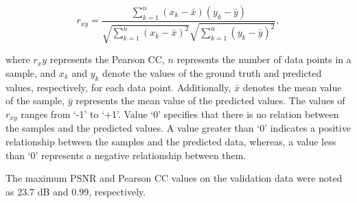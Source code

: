 \begin{equation}
	r_{x 
		y}=\frac{\sum_{k=1}^n\left(x_k-\bar{x}\right)\left(y_k-\bar{y}\right)}{\sqrt{\sum_{k=1}^n\left(x_k-\bar{x}\right)^2}
		\sqrt{\sum_{k=1}^n\left(y_k-\bar{y}\right)^2}},
	\label{eqn:pearsoncc}
\end{equation}

where $r_xy$ represents the Pearson CC, \(n\) represents the number of data points in a sample, and $x_k$ and $y_k$ denote the values of the ground truth and predicted values, respectively, for each data point. 
Additionally, $\bar{x}$ denotes the mean value of the sample, $\bar{y}$ represents the mean value of the predicted values. 
The values of $r_{xy}$ ranges from ‘-1’ to ‘+1’. 
Value ‘0’ specifies that there is no relation between the samples and the predicted values. 
A value greater than ‘0’ indicates a positive relationship between the samples and the predicted data, whereas, a value less than ‘0’ represents a negative relationship between them.

The maximum PSNR and Pearson CC values on the validation data were noted as 23.7 dB and 0.99, respectively.

